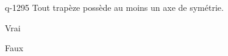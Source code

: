 \begin{truefalse}{q-1295}
Tout trapèze possède au moins un axe de symétrie.
\item Vrai
\item* Faux
\end{truefalse}

